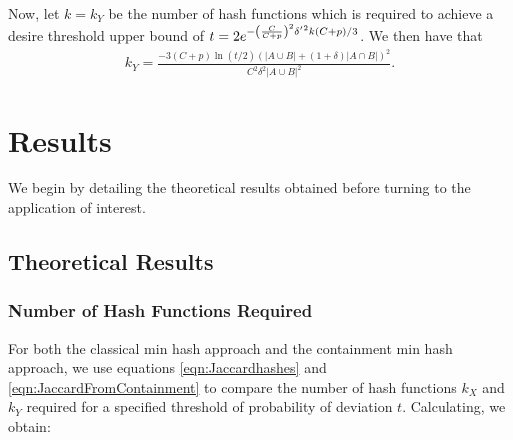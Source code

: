 \documentclass[11pt,reqno]{amsart}
\theoremstyle{remark}
\numberwithin{equation}{section}
\newcommand{\classicX}{X}
\newcommand{\containX}{Y}
\begin{document}
Now, let $k=k_\containX$ be the number of hash functions which is required to achieve a desire threshold upper bound of $t=2e^{-\left(\frac{C}{C+p}\right)^2\delta\rq{}^2k(C+p)/3}$. We then have that
 \begin{align}
 \label{eqn:JaccardFromContainment}
 k_\containX =\frac{-3(C+p)\ln(t/2)\left(|A\cup B|+(1+\delta)|A\cap B|\right)^2}{C^2\delta^2|A\cup B|^2 }.
 \end{align}

 

\section{Results}
We begin by detailing the theoretical results obtained before turning to the application of interest.

\subsection{Theoretical Results}
\subsubsection{Number of Hash Functions Required}
\label{section:NumberOfHashes}
For both the classical min hash approach and the containment min hash approach, we use equations \eqref{eqn:Jaccardhashes} and \eqref{eqn:JaccardFromContainment} to compare the number of hash functions $k_\classicX$ and $k_\containX$ required for a specified threshold of probability of deviation $t$. Calculating, we obtain: 
\end{document}
